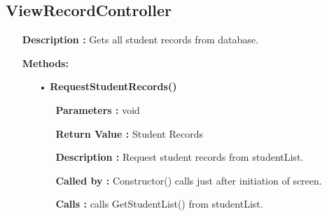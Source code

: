\documentclass{scrreprt}
\begin{document}
\subsection{ViewRecordController}
\begin{enumerate}
\item[] \textbf{Description :} Gets all student records from database.
\item [] \textbf{Methods:}
\begin{itemize}
\item [•] \textbf{RequestStudentRecords()}
\begin{itemize}
\item [] \textbf{Parameters :} void
\item [] \textbf{Return Value :} Student Records
\item [] \textbf{Description :} Request student records from studentList.
\item [] \textbf{Called by :} Constructor() calls just after initiation of screen.
\item [] \textbf{Calls :} calls GetStudentList() from studentList. 
\end{itemize}
\end{itemize}
\end{enumerate}
\end{document}
